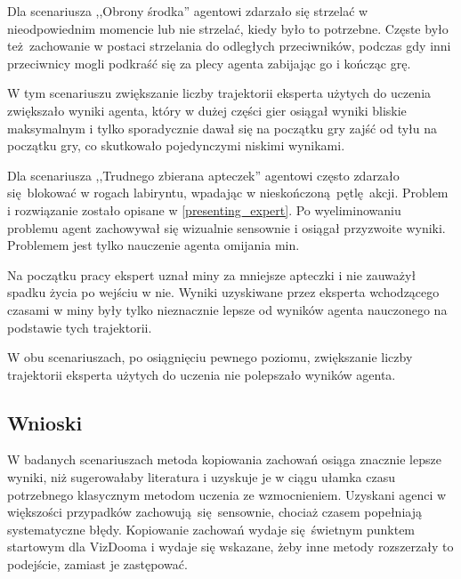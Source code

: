 Dla scenariusza ,,Obrony środka'' agentowi zdarzało się strzelać w nieodpowiednim momencie lub nie strzelać, kiedy było to potrzebne. Częste było też zachowanie w postaci strzelania do odległych przeciwników, podczas gdy inni przeciwnicy mogli podkraść się za plecy agenta zabijając go i kończąc grę.

W tym scenariuszu zwiększanie liczby trajektorii eksperta użytych do uczenia zwiększało wyniki agenta, który w dużej części gier osiągał wyniki bliskie maksymalnym i tylko sporadycznie dawał się na początku gry zajść od tyłu na początku gry, co skutkowało pojedynczymi niskimi wynikami.

Dla scenariusza ,,Trudnego zbierana apteczek'' agentowi często zdarzało się blokować w rogach labiryntu, wpadając w nieskończoną pętlę akcji. Problem i rozwiązanie zostało opisane w \ref{presenting_expert}. Po wyeliminowaniu problemu agent zachowywał się wizualnie sensownie i osiągał przyzwoite wyniki. Problemem jest tylko nauczenie agenta omijania min.

Na początku pracy ekspert uznał miny za mniejsze apteczki i nie zauważył spadku życia po wejściu w nie. Wyniki uzyskiwane przez eksperta wchodzącego czasami w miny były tylko nieznacznie lepsze od wyników agenta nauczonego na podstawie tych trajektorii.

W obu scenariuszach, po osiągnięciu pewnego poziomu, zwiększanie liczby trajektorii eksperta użytych do uczenia nie polepszało wyników agenta. 

\subsection{Wnioski}
W badanych scenariuszach metoda kopiowania zachowań osiąga znacznie lepsze wyniki, niż sugerowałaby literatura i uzyskuje je w ciągu ułamka czasu potrzebnego klasycznym metodom uczenia ze wzmocnieniem. Uzyskani agenci w większości przypadków zachowują się sensownie, chociaż czasem popełniają systematyczne błędy. Kopiowanie zachowań wydaje się świetnym punktem startowym dla VizDooma i wydaje się wskazane, żeby inne metody rozszerzały to podejście, zamiast je zastępować.
